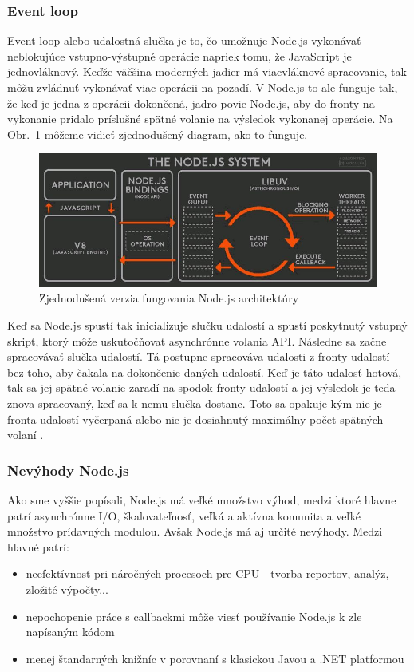 \subsubsection{Event loop}
\indent Event loop alebo udalostná slučka je to, čo umožnuje Node.js vykonávať neblokujúce vstupno-výstupné operácie napriek tomu, že JavaScript je jednovláknový. Keďže väčšina moderných jadier má viacvláknové spracovanie, tak môžu zvládnuť vykonávať viac operácii na pozadí. V Node.js to ale funguje tak, že keď je jedna z operácii dokončená, jadro povie Node.js, aby do fronty na vykonanie pridalo príslušné spätné volanie na výsledok vykonanej operácie. Na Obr.~\ref{fig:event_loop} môžeme vidieť zjednodušený diagram, ako to funguje. 

\begin{figure}[H]
    \centering
    \includegraphics[scale=0.55]{img/evet_loop.jpg}
    \caption{Zjednodušená verzia fungovania Node.js architektúry \cite{nodejs_2}}
    \label{fig:event_loop}
\end{figure}

\indent Keď sa Node.js spustí tak inicializuje slučku udalostí a spustí poskytnutý vstupný skript, ktorý môže uskutočňovať asynchrónne volania API. Následne sa začne spracovávať slučka udalostí. Tá postupne spracováva udalosti z fronty udalostí bez toho, aby čakala na dokončenie daných udalostí. Keď je táto udalosť hotová, tak sa jej spätné volanie zaradí na spodok fronty udalostí a jej výsledok je teda znova spracovaný, keď sa k nemu slučka dostane. Toto sa opakuje kým nie je fronta udalostí vyčerpaná alebo nie je dosiahnutý maximálny počet spätných volaní \cite{nodejs_2}. 

\subsubsection{Nevýhody Node.js}
\indent Ako sme vyššie popísali, Node.js má veľké množstvo výhod, medzi ktoré hlavne patrí asynchrónne I/O, škalovateľnosť, veľká a aktívna komunita a veľké množstvo prídavných modulou. Avšak Node.js má aj určité nevýhody. Medzi hlavné patrí:
\begin{itemize}
    \item neefektívnosť pri náročných procesoch pre CPU - tvorba reportov, analýz, zložité výpočty... 
    \item nepochopenie práce s callbackmi môže viesť používanie Node.js k zle napísaným kódom
    \item menej štandarných knižníc v porovnaní s klasickou Javou a .NET platformou
\end{itemize}

